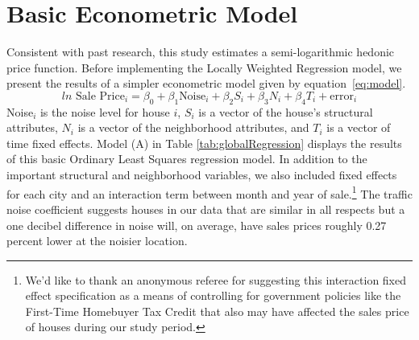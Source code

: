 \documentclass[leqno]{article}\usepackage[]{graphicx}\usepackage[]{color}
\begin{document}
\section{Basic Econometric Model}\label{basicModel}
Consistent with past research, this study estimates a semi-logarithmic hedonic price function.  Before implementing the Locally Weighted Regression model, we present the results of a simpler econometric model given by equation~\eqref{eq:model}.
\begin{equation}\label{eq:model}	
ln \textrm{ Sale Price}_i = \beta _0 + \beta _1 \textrm{Noise}_i+ \beta _2 S_i+ \beta _3 N_i + \beta _4 T_i + \textrm{error}_i
\end{equation}
Noise$_i$ is the noise level for house $i$, $S_i$ is a vector of the house's structural attributes, $N_i$ is a vector of the neighborhood attributes, and $T_i$ is a vector of time fixed effects. Model (A) in Table \ref{tab:globalRegression} displays the results of this basic Ordinary Least Squares regression model. In addition to the important structural and neighborhood variables, we also included fixed effects for each city and an interaction term between month and year of sale.\footnote{We'd like to thank an anonymous referee for suggesting this interaction fixed effect specification as a means of controlling for government policies like the First-Time Homebuyer Tax Credit that also may have affected the sales price of houses during our study period. } The traffic noise coefficient suggests houses in our data that are similar in all respects but a one decibel difference in noise will, on average, have sales prices roughly 0.27 percent lower at the noisier location. 
\end{document}
